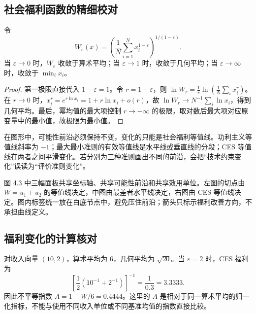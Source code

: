 \subsection{社会福利函数的精细校对}

\begin{proposition}
令
\[
W_\varepsilon(x)=\left(\frac1N\sum_{i=1}^Nx_i^{1-\varepsilon}\right)^{1/(1-\varepsilon)}.
\]
当 $\varepsilon\to0$ 时，$W_\varepsilon$ 收敛于算术平均；当 $\varepsilon\to1$ 时，收敛于几何平均；当 $\varepsilon\to\infty$ 时，收敛于 $\min_i x_i$。
\end{proposition}
\begin{proof}
第一极限直接代入 $1-\varepsilon=1$。令 $r=1-\varepsilon$，则 $\ln W_r=\frac1r\ln(\frac1N\sum_i x_i^r)$。在 $r\to0$ 时，$x_i^r=e^{r\ln x_i}=1+r\ln x_i+o(r)$，故
$\ln W_r\to N^{-1}\sum_i\ln x_i$，得到几何平均。最后，幂均值的最大项控制 $r\to-\infty$ 的极限，取对数后最大项对应原变量中的最小值，故极限为最小值。
\end{proof}

\begin{example}[同一可能性前沿上的切点]
在图形中，可能性前沿必须保持不变，变化的只能是社会福利等值线。功利主义等值线斜率为 $-1$；最大最小准则的有效等值线是水平线或垂直线的分段；CES 等值线在两者之间平滑变化。若分别为三种准则画出不同的前沿，会把“技术约束变化”误读为“评价准则变化”。
\end{example}

\begin{remark}[图 4.3 的读图规则]
图 4.3 中三幅面板共享坐标轴、共享可能性前沿和共享效用单位。左图的切点由 $W=u_1+u_2$ 的等值线决定，中图由最差者水平线决定，右图由 CES 等值线决定。图内标签统一放在白底节点中，避免压住前沿；箭头只标示福利改善方向，不承担曲线定义。
\end{remark}

\subsection{福利变化的计算核对}
对收入向量 $(10,2)$，算术平均为 $6$，几何平均为 $\sqrt{20}$。当 $\varepsilon=2$ 时，CES 福利为
\[
\left[\frac12(10^{-1}+2^{-1})\right]^{-1}=\frac1{0.3}=3.3333.
\]
因此不平等指数 $A=1-W/6=0.4444$。这里的 $A$ 是相对于同一算术平均的归一化指标，不能与使用不同收入单位或不同基准均值的指数直接比较。
